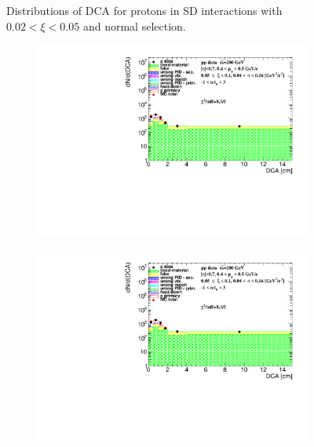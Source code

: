 \begin{figure}[h!]
\begin{subfigure}{.45\textwidth}
	\end{subfigure}
	\caption{Distributions of DCA for protons in SD interactions with $0.02 < \xi<0.05$ and normal selection.}
	\label{fig:dca_proton_0t}
\end{figure}
\begin{figure}[h!]
	\centering
	\begin{subfigure}{.45\textwidth}
		\includegraphics[width=\linewidth, page=1]{chapters/chrgSTAR/img/DCAproton/background_p_1.pdf}
	\end{subfigure}
	\begin{subfigure}{.45\textwidth}
		\includegraphics[width=\linewidth, page=2]{chapters/chrgSTAR/img/DCAproton/background_p_1.pdf}
	\end{subfigure}
	\begin{subfigure}{.45\textwidth}

\end{subfigure}
\end{figure}
